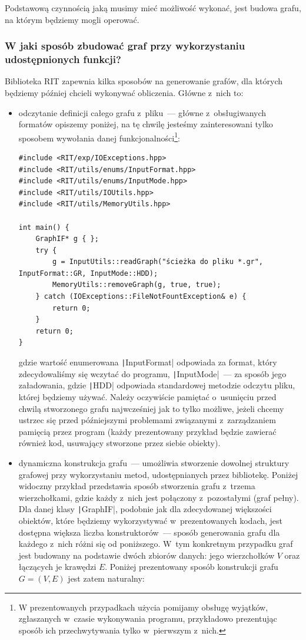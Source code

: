 Podstawową czynnością jaką musimy mieć możliwość wykonać, jest budowa grafu, na którym będziemy mogli operować. 


\subsubsection{W jaki sposób zbudować graf przy wykorzystaniu udostępnionych funkcji?}


Biblioteka \textsc{RIT} zapewnia kilka sposobów na generowanie grafów, dla których będziemy później chcieli wykonywać obliczenia.
Główne z~nich to:
\begin{itemize}
	\item odczytanie definicji całego grafu z~pliku~--- główne z~obsługiwanych formatów opiszemy poniżej, na tę chwilę jesteśmy zainteresowani tylko sposobem wywołania danej funkcjonalności\footnote{
		W prezentowanych przypadkach użycia pomijamy obsługę wyjątków, zgłaszanych w~czasie wykonywania programu, przykładowo prezentując sposób ich przechwytywania tylko w~pierwszym z~nich.
	}:
	
	\begin{verbatim}
#include <RIT/exp/IOExceptions.hpp>
#include <RIT/utils/enums/InputFormat.hpp>
#include <RIT/utils/enums/InputMode.hpp>
#include <RIT/utils/IOUtils.hpp>
#include <RIT/utils/MemoryUtils.hpp>

int main() {
	GraphIF* g { };
	try {
		g = InputUtils::readGraph("ścieżka do pliku *.gr", InputFormat::GR, InputMode::HDD);
		MemoryUtils::removeGraph(g, true, true);
	} catch (IOExceptions::FileNotFountException& e) {
		return 0;
	}
	return 0;
}
	\end{verbatim}
	gdzie wartość enumerowana \texttt|InputFormat| odpowiada za format, który zdecydowaliśmy się wczytać do programu, \texttt|InputMode|~--- za sposób jego załadowania, gdzie \texttt|HDD| odpowiada standardowej metodzie odczytu pliku, której będziemy używać.
	Należy oczywiście pamiętać o~usunięciu przed chwilą stworzonego grafu najwcześniej jak to tylko możliwe, jeżeli chcemy ustrzec się przed późniejszymi problemami związanymi z~zarządzaniem pamięcią przez program (każdy prezentowany przykład będzie zawierać również kod, usuwający stworzone przez siebie obiekty).
	\item dynamiczna konstrukcja grafu~--- umożliwia stworzenie dowolnej struktury grafowej przy wykorzystaniu metod, udostępnianych przez bibliotekę.
	Poniżej widoczny przykład przedstawia sposób stworzenia grafu z~trzema wierzchołkami, gdzie każdy z~nich jest połączony z~pozostałymi (graf pełny).
	Dla danej klasy \texttt|GraphIF|, podobnie jak dla zdecydowanej większości obiektów, które będziemy wykorzystywać w~prezentowanych kodach, jest dostępna większa liczba konstruktorów~--- sposób generowania grafu dla każdego z~nich różni się od poniższego.
	W~tym konkretnym przypadku graf jest budowany na podstawie dwóch zbiorów danych: jego wierzchołków $V$ oraz łączących je krawędzi $E$.
	Poniżej prezentowany sposób konstrukcji grafu $G = \left( V, E \right)$ jest zatem naturalny:
	

\end{itemize}
